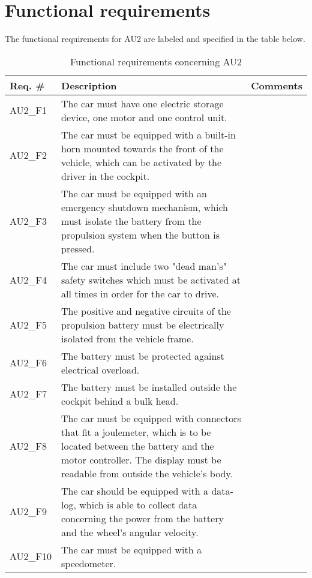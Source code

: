 \section{Functional requirements}
The functional requirements for AU2 are labeled and specified in the table below.

\begin{table}[h!]
	\label{FREQ_AU2}
	\centering
	\begin{tabular}{|p{2 cm}|p{7 cm}|p{4 cm}|}
		\hline
		\textbf{Req. \#} & \textbf{Description} & \textbf{Comments} \\\hline
		AU2\_F1		& The car must have one electric storage device, one motor and one control unit. &   \\\hline
		AU2\_F2		& The car must be equipped with a built-in horn mounted towards the front of the vehicle, which can be activated by the driver in the cockpit. &   \\\hline
		AU2\_F3		& The car must be equipped with an emergency shutdown mechanism, which must isolate the battery from the propulsion system when the button is pressed. &   \\\hline
		AU2\_F4		& The car must include two "dead man's" safety switches which must be activated at all times in order for the car to drive. &   \\\hline
		AU2\_F5	& The positive and negative circuits of the propulsion battery  must be electrically isolated from the vehicle frame. &   \\\hline
		AU2\_F6	& 
		The battery must be protected against electrical overload. &   \\\hline
		AU2\_F7		& The battery must be installed outside the cockpit behind a bulk head. &   \\\hline
		AU2\_F8	\fxnote{Joulemeter - Laimonas}	& The car must be equipped with connectors that fit a joulemeter, which is to be located between the battery and the motor controller. The display must be readable from outside the vehicle's body. &   \\\hline
		AU2\_F9	& The car should be equipped with a data-log, which is able to collect data concerning the power from the battery and the wheel's angular velocity. &   \\\hline
		AU2\_F10	& The car must be equipped with a speedometer. &   \\\hline
	\end{tabular}
	\caption{Functional requirements concerning AU2}
\end{table}

